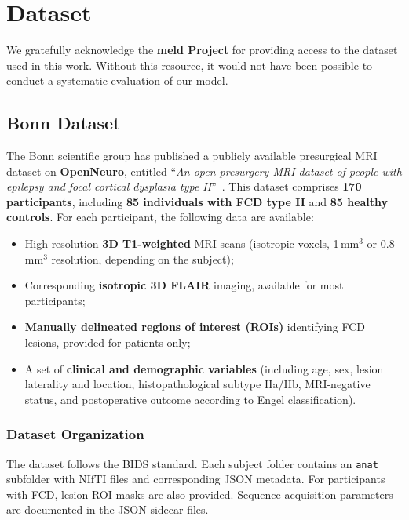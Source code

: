 \documentclass[FCD_GNN.tex]{subfiles}
\begin{document}
\chapter{Dataset}
\label{chapter:Dataset}
We gratefully acknowledge the \textbf{\ac{meld} Project} for providing access to the dataset used in this work. 
Without this resource, it would not have been possible to conduct a systematic evaluation of our model.

\section{Bonn Dataset}

The Bonn scientific group has published a publicly available presurgical MRI dataset on \textbf{OpenNeuro}, entitled 
“\textit{An open presurgery MRI dataset of people with epilepsy and focal cortical dysplasia type II}”~\cite{Rueber2023_BonnFCDDataset}.  
This dataset comprises \textbf{170 participants}, including \textbf{85 individuals with FCD type II} and \textbf{85 healthy controls}. 
For each participant, the following data are available:

\begin{itemize}
    \item High-resolution \textbf{3D T1-weighted} MRI scans (isotropic voxels, 1\,mm$^{3}$ or 0.8\,mm$^{3}$ resolution, depending on the subject);
    \item Corresponding \textbf{isotropic 3D FLAIR} imaging, available for most participants;
    \item \textbf{Manually delineated regions of interest (ROIs)} identifying FCD lesions, provided for patients only;
    \item A set of \textbf{clinical and demographic variables} (including age, sex, lesion laterality and location, histopathological subtype IIa/IIb, MRI-negative status, and postoperative outcome according to Engel classification).
\end{itemize}

\subsection*{Dataset Organization}
The dataset follows the BIDS standard. Each subject folder contains an \texttt{anat} subfolder with NIfTI files and corresponding JSON metadata. 
For participants with FCD, lesion ROI masks are also provided. Sequence acquisition parameters are documented in the JSON sidecar files.  
\end{document}
